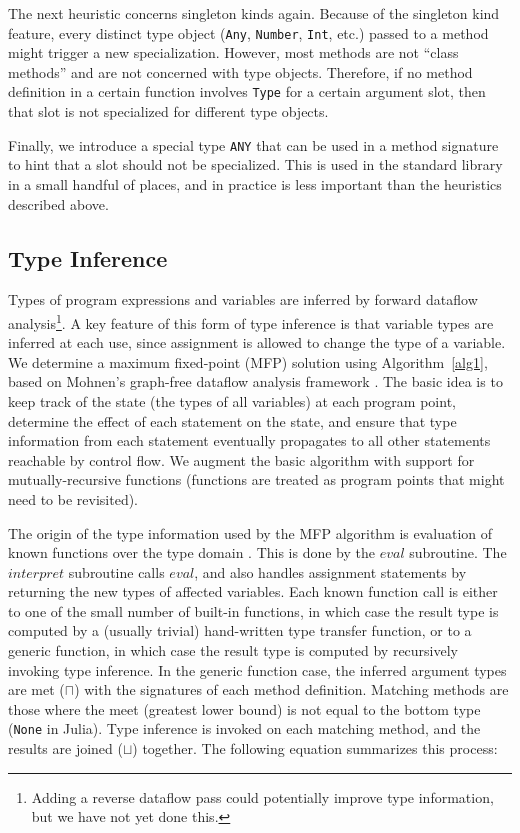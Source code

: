 \documentclass[9pt]{sigplanconf}
\begin{document}
The next heuristic concerns singleton kinds again. Because of the singleton
kind feature, every distinct type object ({\tt Any}, {\tt Number}, {\tt Int},
etc.) passed to a method might trigger a new specialization. However, most
methods are not ``class methods'' and are not concerned with type objects.
Therefore, if no method definition in a certain function involves {\tt Type}
for a certain argument slot, then that slot is not specialized for different
type objects.

Finally, we introduce a special type {\tt ANY} that can be used in a method
signature to hint that a slot should not be specialized. This is used in the
standard library in a small handful of places, and in practice is less
important than the heuristics described above.


\subsection{Type Inference}

Types of program expressions and variables are inferred by forward
dataflow analysis\footnote{Adding a reverse dataflow pass could potentially
improve type information, but we have not yet done this.}.
A key feature of this form of type inference is that variable types are
inferred at each use, since assignment is allowed to change the type of
a variable.
We determine a maximum fixed-point (MFP) solution using
Algorithm~\ref{alg1}, based on
Mohnen's graph-free dataflow analysis framework \cite{graphfree}. The basic
idea is to keep track of the state (the types of all variables) at each program
point, determine the effect of each statement on the state, and ensure that
type information from each statement eventually propagates to all other
statements reachable by control flow. We augment the basic algorithm with
support for mutually-recursive functions
(functions are treated as program points that might need to be revisited).

The origin of the type information used by the MFP algorithm is
evaluation of known functions over the type domain \cite{abstractinterp}.
This is done by the $eval$ subroutine. The $interpret$ subroutine calls
$eval$, and also handles assignment statements by returning the new types
of affected variables. Each known function
call is either to one of the small number of built-in functions, in which
case the result type is computed by a (usually trivial) hand-written
type transfer function, or to a generic function, in which case the result
type is computed by recursively invoking type inference. In the generic
function case, the inferred argument types are met ($\sqcap$) with the
signatures of each method definition. Matching methods are those where the
meet (greatest lower bound)
is not equal to the bottom type ({\tt None} in Julia).
Type inference is invoked on each matching
method, and the results are joined ($\sqcup$) together. The following equation
summarizes this process:
\end{document}
